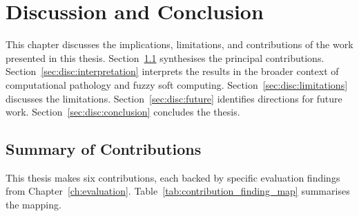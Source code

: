 
\chapter{Discussion and Conclusion}
\label{ch:discussion}

This chapter discusses the implications, limitations, and contributions of the work presented in this thesis.
Section~\ref{sec:disc:contributions} synthesises the principal contributions.
Section~\ref{sec:disc:interpretation} interprets the results in the broader context of computational pathology and fuzzy soft computing.
Section~\ref{sec:disc:limitations} discusses the limitations.
Section~\ref{sec:disc:future} identifies directions for future work.
Section~\ref{sec:disc:conclusion} concludes the thesis.


\section{Summary of Contributions}
\label{sec:disc:contributions}

This thesis makes six contributions, each backed by specific
evaluation findings from Chapter~\ref{ch:evaluation}.
Table~\ref{tab:contribution_finding_map} summarises the mapping.

